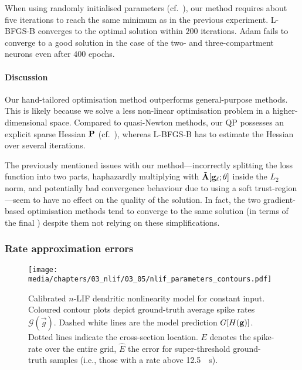 When using randomly initialised parameters (cf.~), our method requires about five iterations to reach the same minimum as in the previous experiment.
L-BFGS-B converges to the optimal solution within $200$ iterations.
Adam fails to converge to a good solution in the case of the two- and three-compartment neurons even after $400$ epochs.

\paragraph{Discussion}
Our hand-tailored optimisation method outperforms general-purpose methods.
This is likely because we solve a less non-linear optimisation problem in a higher-dimensional space.
Compared to quasi-Newton methods, our QP possesses an explicit sparse Hessian $\mathbf{P}$ (cf.~), whereas L-BFGS-B has to estimate the Hessian over several iterations.

The previously mentioned issues with our method---incorrectly splitting the loss function into two parts, haphazardly multiplying with $\mathbf{\tilde A}[\mathbf{g}_\ell; \mathbf{\theta}]$ inside the $L_2$ norm, and potentially bad convergence behaviour due to using a soft trust-region---seem to have no effect on the quality of the solution.
In fact, the two gradient-based optimisation methods tend to converge to the same solution (in terms of the final \NRMSE) despite them not relying on these simplifications.

\subsubsection{Rate approximation errors}

\begin{figure}[t]
	\texttt{[image: media/chapters/03\_nlif/03\_05/nlif\_parameters\_contours.pdf]}
	\caption[Calibrated $n$-LIF dendritic nonlinearity model for constant input]{
		Calibrated $n$-LIF dendritic nonlinearity model for constant input.
		Coloured contour plots depict ground-truth average spike rates $\mathscr{G}(\vec g)$.
		Dashed white lines are the model prediction $G[{H}(\mathbf{g})]$. Dotted lines indicate the cross-section location.
		$E$ denotes the spike-rate \RMSE over the entire grid, $\hat E$ the error for super-threshold ground-truth samples (i.e., those with a rate above \SI{12.5}{\per\second}).
	}
	\label{fig:nlif_parameters_contours}
\end{figure}

